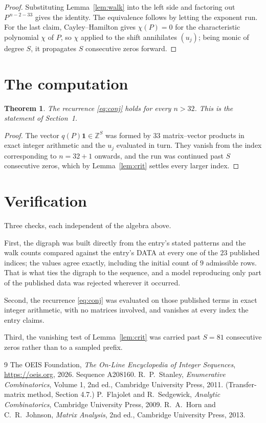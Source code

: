 \documentclass[11pt,a4paper]{article}
\theoremstyle{plain}
\newtheorem{theorem}{Theorem}
\theoremstyle{definition}
\begin{document}
\begin{proof}
Substituting Lemma~\ref{lem:walk} into the left side and factoring out
$P^{\,n-2-33}$ gives the identity. The equivalence follows by letting the exponent
run. For the last claim, Cayley--Hamilton gives $\chi(P)=0$ for the characteristic
polynomial $\chi$ of $P$, so $\chi$ applied to the shift annihilates $(u_j)$; being monic of
degree $S$, it propagates $S$ consecutive zeros forward.
\end{proof}

\section{The computation}

\begin{theorem}
The recurrence \eqref{eq:conj} holds for every $n>32$. This is the statement of
Section~1.
\end{theorem}

\begin{proof}
The vector $q(P)\mathbf{1}\in\mathbb{Z}^{S}$ was formed by $33$ matrix--vector
products in exact integer arithmetic and the $u_j$ evaluated in turn. They vanish from the
index corresponding to $n=32+1$ onwards, and the run was continued past $S$ consecutive
zeros, which by Lemma~\ref{lem:crit} settles every larger index.
\end{proof}

\section{Verification}

Three checks, each independent of the algebra above.

First, the digraph was built directly from the entry's stated patterns and the walk counts
compared against the entry's DATA at every one of the $23$ published indices; the
values agree exactly, including the initial count of $9$ admissible rows. That is
what ties the digraph to the sequence, and a model reproducing only part of the published
data was rejected wherever it occurred.

Second, the recurrence \eqref{eq:conj} was evaluated on those published terms in exact
integer arithmetic, with no matrices involved, and vanishes at every index the entry claims.

Third, the vanishing test of Lemma~\ref{lem:crit} was carried past $S=81$ consecutive
zeros rather than to a sampled prefix.

\begin{thebibliography}{9}
 The OEIS Foundation, \emph{The On-Line Encyclopedia of Integer
Sequences}, \url{https://oeis.org}, 2026. Sequence A208160.
 R.~P.~Stanley, \emph{Enumerative Combinatorics}, Volume 1, 2nd ed.,
Cambridge University Press, 2011. (Transfer-matrix method, Section 4.7.)
 P.~Flajolet and R.~Sedgewick, \emph{Analytic Combinatorics}, Cambridge
University Press, 2009.
 R.~A.~Horn and C.~R.~Johnson, \emph{Matrix Analysis}, 2nd ed., Cambridge
University Press, 2013.
\end{thebibliography}
\end{document}
